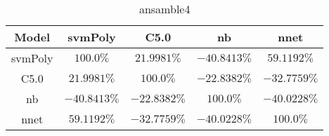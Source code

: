 \begin{table}[!ht]
	\centering
	\begin{tabular}{|c|c|c|c|c|}
		\hline
		Model & svmPoly & C5.0 & nb & nnet \\ \hline
		svmPoly & $100.0\%$ & $21.9981\%$ & $-40.8413\%$ & $59.1192\%$ \\ \hline
		C5.0 & $21.9981\%$ & $100.0\%$ & $-22.8382\%$ & $-32.7759\%$ \\ \hline
		nb & $-40.8413\%$ & $-22.8382\%$ & $100.0\%$ & $-40.0228\%$ \\ \hline
		nnet & $59.1192\%$ & $-32.7759\%$ & $-40.0228\%$ & $100.0\%$ \\ \hline
	\end{tabular}
	\caption{ansamble4}
	\label{tab:ansamble4}
\end{table}
